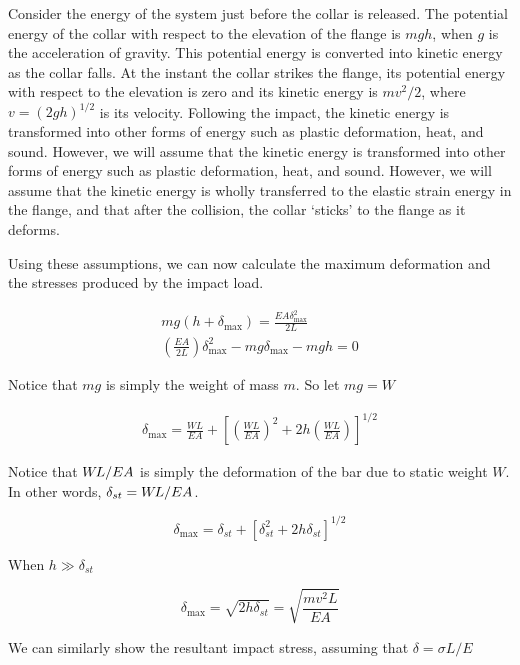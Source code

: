 \documentclass[
10pt,
a4paper,
openany,
svgnames,
]{book} %
\begin{document}
  Consider the energy of the system just before the collar is released. The potential energy of the collar with respect to the elevation of the flange is $mgh$, when $g$ is the acceleration of gravity. This potential energy is converted into kinetic energy as the collar falls. At the instant the collar strikes the flange, its potential energy with respect to the elevation is zero and its kinetic energy is $mv^2/2$, where $v = (2gh)^{1/2}$ is its velocity. Following the impact, the kinetic energy is transformed into other forms of energy such as plastic deformation, heat, and sound. However, we will assume that the kinetic energy is transformed into other forms of energy such as plastic deformation, heat, and sound. However, we will assume that the kinetic energy is wholly transferred to the elastic strain energy in the flange, and that after the collision, the collar ‘sticks’ to the flange as it deforms.

Using these assumptions, we can now calculate the maximum deformation and the stresses produced by the impact load.

\begin{gather}
  mg(h+ \delta_{\max}) = \frac{EA \delta_{\max}^2}{2L} \nonumber \\
  \left( \frac{EA}{2L} \right) \delta_{\max}^2 - mg \delta_{\max} - mgh = 0 \nonumber
\end{gather}

Notice that $mg$ is simply the weight of mass $m$. So let $mg = W$

\begin{align}
  \delta_{\max} = \frac{WL}{EA} + \left[ \left( \frac{WL}{EA} \right)^2 + 2h \left( \frac{WL}{EA} \right) \right]^{1/2}
\end{align}

Notice that $W\mspace{-2mu}L/EA$ is simply the deformation of the bar due to static weight $W$. In other words, $\delta_{st} = W\mspace{-2mu}L/EA$.

\begin{equation}
  \delta_{\max} = \delta_{st} + \left[ \delta_{st}^2 + 2h\delta_{st} \right]^{1/2}
\end{equation}

When $h \gg \delta_{st}$

\begin{equation}
  \delta_{\max} = \sqrt{2h \delta_{st}} = \sqrt{ \frac{mv^2L}{EA} }
\end{equation}

We can similarly show the resultant impact stress, assuming that $\delta = \sigma L / E$
\end{document}
